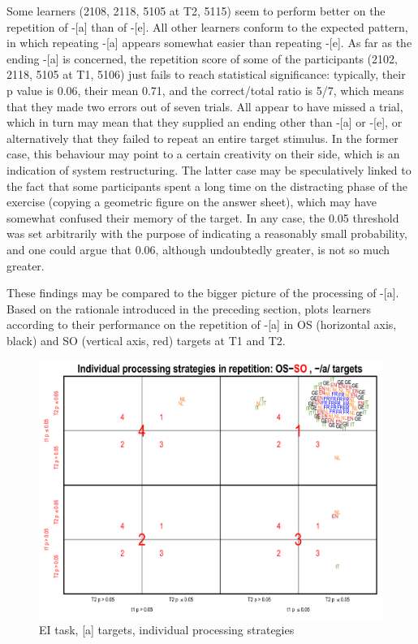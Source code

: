 Some learners (2108, 2118, 5105 at T2, 5115) seem to perform better on the repetition of -[a]  than of -[e]. All other learners conform to the expected pattern, in which repeating -[a] appears somewhat easier than repeating -[e]. As far as the ending -[a] is concerned, the repetition score of some of the participants (2102, 2118, 5105 at T1, 5106) just fails to reach statistical significance: typically, their p value  is 0.06, their mean 0.71, and the correct/total ratio is 5/7, which means that they made two errors out of seven trials. All appear to have missed a trial, which in turn may mean that they supplied an ending other than -[a] or -[e], or alternatively that they failed to repeat an entire target stimulus. In the former case, this behaviour may point to a certain creativity on their side, which is an indication of system restructuring. The latter case may be speculatively linked to the fact that some participants spent a long time on the distracting phase of the exercise (copying a geometric figure on the answer sheet), which may have somewhat confused their memory of the target. In any case, the 0.05 threshold was set arbitrarily with the purpose of indicating a reasonably small probability, and one could argue that 0.06, although undoubtedly greater, is not so much greater.

These findings may be compared to the bigger picture of the processing of -[a]. Based on the rationale introduced in the preceding section,  plots learners according to their performance on the repetition of -[a] in OS (horizontal axis, black) and SO (vertical axis, red) targets at T1 and T2.

\begin{figure}
    \includegraphics[width=\textwidth]{figures/04-8.pdf}
    \caption{EI task, [a] targets, individual processing strategies}
    \label{fig:04:8}
\end{figure}

